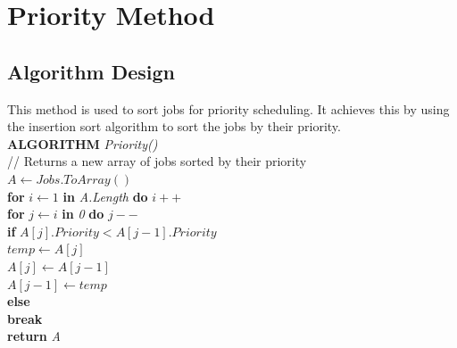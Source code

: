 \documentclass[12pt,a4paper]{article}
\begin{document}
	\section{Priority Method}
		\subsection{Algorithm Design}
			This method is used to sort jobs for priority scheduling. It achieves this by using the 
			insertion sort algorithm to sort the jobs by their priority.\\
			
			\textbf{ALGORITHM} \textit{Priority()}\\
			\null\hspace{1cm}// Returns a new array of jobs sorted by their priority\\
			\null\hspace{1cm}\textit{$A \gets Jobs.ToArray()$}\\
			\null\hspace{1cm}\textbf{for} \textit{$i \gets 1$} \textbf{in} \textit{A.Length} \textbf{do} \textit{$i++$}\\
			\null\hspace{2cm}\textbf{for} \textit{$j \gets i$} \textbf{in} \textit{0} \textbf{do} \textit{$j--$}\\
			\null\hspace{3cm}\textbf{if} \textit{$A[j].Priority < A[j - 1].Priority$}\\
			\null\hspace{4cm}\textit{$temp \gets A[j]$}\\
			\null\hspace{4cm}\textit{$A[j] \gets A[j - 1]$}\\
			\null\hspace{4cm}\textit{$A[j - 1] \gets temp$}\\
			\null\hspace{3cm}\textbf{else}\\
			\null\hspace{4cm}\textbf{break}\\
			\null\hspace{1cm}\textbf{return} \textit{A}\\
		
\end{document}
